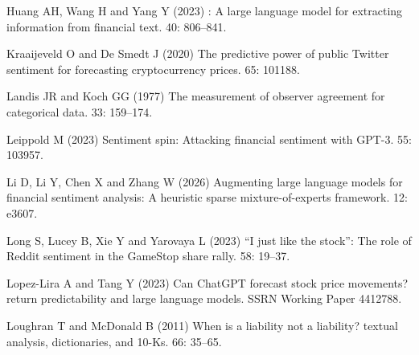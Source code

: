 \documentclass{aims}
\numberwithin{equation}{section}
\begin{document}
\begin{thebibliography}{}
\newblock Huang AH, Wang H and Yang Y (2023)
: A large language model for extracting information from financial text.
 40: 806--841. 

\newblock Kraaijeveld O and De Smedt J (2020)
\newblock The predictive power of public {Twitter} sentiment for forecasting
  cryptocurrency prices.
 65: 101188. 

\newblock Landis JR and Koch GG (1977)
\newblock The measurement of observer agreement for categorical data.
 33: 159--174. 

\newblock Leippold M (2023)
\newblock Sentiment spin: Attacking financial sentiment with {GPT-3}.
 55: 103957. 

\newblock Li D, Li Y, Chen X and Zhang W (2026)
\newblock Augmenting large language models for financial sentiment analysis: A
  heuristic sparse mixture-of-experts framework.
 12: e3607. 

\newblock Long S, Lucey B, Xie Y and Yarovaya L (2023)
\newblock ``{I} just like the stock'': The role of {Reddit} sentiment in the
  {GameStop} share rally.
 58: 19--37. 

\newblock Lopez-Lira A and Tang Y (2023)
\newblock Can {ChatGPT} forecast stock price movements? return predictability
  and large language models.
\newblock SSRN Working Paper 4412788. 

\newblock Loughran T and McDonald B (2011)
\newblock When is a liability not a liability? textual analysis, dictionaries,
  and 10-{K}s.
 66: 35--65. 


\end{thebibliography}
\end{document}
